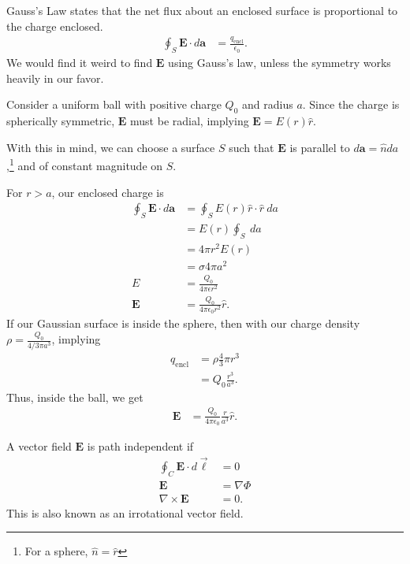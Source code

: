 \documentclass[10pt]{mypackage}
\begin{document}
\begin{example}
  Gauss's Law states that the net flux about an enclosed surface is proportional to the charge enclosed.
  \begin{align*}
    \oint_{S}^{} \mathbf{E}\cdot d\mathbf{a} &= \frac{q_{\text{encl}}}{\epsilon_{0}}.
  \end{align*}
  We would find it weird to find $\mathbf{E}$ using Gauss's law, unless the symmetry works heavily in our favor.\newline

  Consider a uniform ball with positive charge $Q_0$ and radius $a$. Since the charge is spherically symmetric, $\mathbf{E}$ must be radial, implying $\mathbf{E} = E(r)\widehat{r}$.\newline

  With this in mind, we can choose a surface $S$ such that $\mathbf{E}$ is parallel to $d\mathbf{a} = \widehat{n} da$,\footnote{For a sphere, $\widehat{n} = \widehat{r}$} and of constant magnitude on $S$.\newline

  For $r > a$, our enclosed charge is
  \begin{align*}
    \oint_{S}\mathbf{E}\cdot d\mathbf{a} &= \oint_{S}E(r)\widehat{r}\cdot \widehat{r}\:da\\
                                         &= E(r)\oint_{S}\:da\\
                                         &= 4\pi r^2 E(r)\\
                                         &= \sigma 4\pi a^2\\
    E &= \frac{Q_0}{4\pi \epsilon r^2}\\
    \mathbf{E} &= \frac{Q_0}{4\pi \epsilon_0 r^2}\widehat{r}.
  \end{align*}
  If our Gaussian surface is inside the sphere, then with our charge density $\rho = \frac{Q_0}{4/3 \pi a^3}$, implying
  \begin{align*}
    q_{\text{encl}} &= \rho \frac{4}{3}\pi r^3\\
                    &= Q_0\frac{r^3}{a^3}.
  \end{align*}
  Thus, inside the ball, we get
  \begin{align*}
    \mathbf{E} &= \frac{Q_0}{4\pi \epsilon_0}\frac{r}{a^3}\widehat{r}.
  \end{align*}
\end{example}
\begin{recall}
  A vector field $\mathbf{E}$ is path independent if
  \begin{align*}
    \oint_{C} \mathbf{E}\cdot d\vec{\ell} &= 0\\
    \mathbf{E} &= \nabla \Phi\\
    \nabla \times \mathbf{E} &= 0.
  \end{align*}
  This is also known as an irrotational vector field.
\end{recall}
\end{document}
